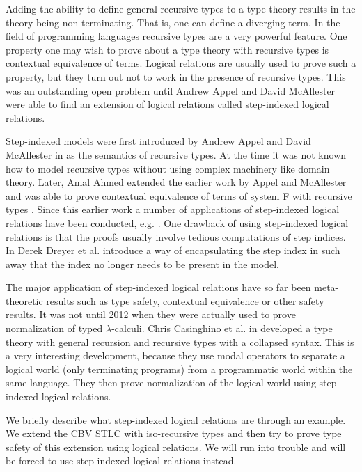 Adding the ability to define general recursive types to a type theory
results in the theory being non-terminating.  That is, one can define a
diverging term.  In the field of programming languages recursive
types are a very powerful feature.  One property one may wish to prove
about a type theory with recursive types is contextual
equivalence of
terms.  Logical relations are usually used to prove such a property,
but they turn out not to work in the presence of recursive types.
This was an outstanding open problem until Andrew Appel and David 
McAllester were able to find an extension of logical relations called
step-indexed logical relations.

Step-indexed models were first introduced by Andrew Appel and David \\
McAllester in \cite{Appel:2001} as the semantics of recursive types.
At the time it was not known how to model recursive types without
using complex machinery like domain theory.  Later, Amal Ahmed
extended the earlier work by Appel and McAllester and was able to
prove contextual equivalence of terms of system F with recursive types
\cite{Ahmed:2006}.  Since this earlier work a number of applications
of step-indexed logical relations have been conducted, e.g.
\cite{Acar:2008,Ahmed:2009,Neis:2009,Vytiniotis:2009}.  One drawback
of using step-indexed logical relations is that the proofs usually
involve tedious computations of step indices.  In \cite{Dreyer:2010}
Derek Dreyer et al. introduce a way of encapsulating the step index in
such away that the index no longer needs to be present in the model.

The major application of step-indexed logical relations have so far been
meta-theoretic results such as type safety, contextual equivalence or
other safety results. It was not until 2012 when they were actually
used to prove normalization of typed $\lambda$-calculi.  Chris
Casinghino et al. in \cite{Casinghino:2012} developed a type theory
with general recursion and recursive types with a collapsed syntax.
This is a very interesting development, because they use modal
operators to separate a logical world (only terminating programs) from
a programmatic world within the same language.  They then prove
normalization of the logical world using step-indexed logical relations.

We briefly describe what step-indexed logical relations are through an
example.  We extend the CBV STLC with iso-recursive
types and then try
to prove type safety of this extension using logical relations.  We
will run into trouble and will be forced to use step-indexed logical
relations instead.



